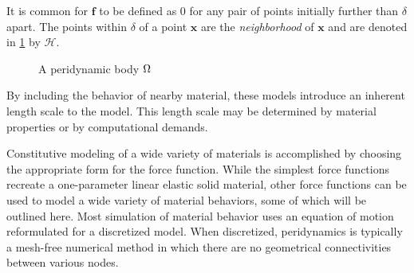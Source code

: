 It is common for \(\mathbf{f}\) to be defined as \(0\) for any pair of points initially further than \(\delta\) apart. 
The points within \(\delta\) of a point \(\mathbf{x}\) are the \textit{neighborhood} of \(\mathbf{x}\) and are denoted in \cref{fig:PDbody} by \(\mathcal{H}\).
%
\begin{figure}[h]
  \centering
{}
\caption{A peridynamic body \protect\(\Omega\protect\)}
\label{fig:PDbody}
\end{figure}
% 
By including the behavior of nearby material, these models introduce an inherent length scale to the model. 
This length scale may be determined by material properties or by computational demands.

Constitutive modeling of a wide variety of materials is accomplished by choosing the appropriate form for the force function.
While the simplest force functions recreate a one-parameter linear elastic solid material, other force functions can be used to model a wide variety of material behaviors, some of which will be outlined here.
Most simulation of material behavior uses an equation of motion reformulated for a discretized model.
When discretized, peridynamics is typically a mesh-free numerical method in which there are no geometrical connectivities between various nodes.

